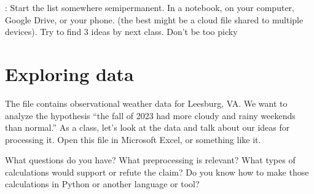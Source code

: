 \documentclass[letterpaper,10pt,english]{jupyterBook}
\begin{document}
\sphinxAtStartPar
{}: Start the list somewhere semi\sphinxhyphen{}permanent. In a notebook, on your computer, Google Drive, or your phone. (the best might be a cloud file shared to multiple devices). Try to find 3 ideas by next class. Don’t be too picky

\sphinxstepscope


\chapter{Exploring data}
\label{\detokenize{lessons/hw02:exploring-data}}\label{\detokenize{lessons/hw02::doc}}
\sphinxAtStartPar
The file {\hyperref[\detokenize{lessons/hw02:../data/weather-daylight.csv}]{}} contains observational weather data for Leesburg, VA. We want to
analyze the hypothesis “the fall of 2023 had more cloudy and rainy weekends than normal.”
As a class, let’s look at the data and talk about our ideas for processing it. Open this file in Microsoft Excel, or something like it.

\sphinxAtStartPar
What questions do you have? What pre\sphinxhyphen{}processing is relevant?
What types of calculations would support or refute the claim? Do you know how to make
those calculations in Python or another language or tool?
\end{document}
